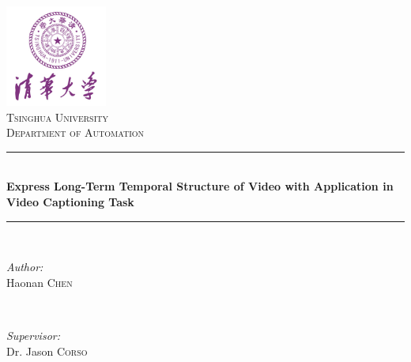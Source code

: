 



\begin{titlepage}

\newcommand{\HRule}{\rule{\linewidth}{0.5mm}} %

\center %

\includegraphics[width=0.25\textwidth]{resources/logo.jpg}\\[1cm] %


\textsc{\LARGE Tsinghua University}\\[1.5cm] %
\textsc{\Large Department of Automation}\\[2.5cm] %


\HRule \\[0.4cm]
{ \large \bfseries Express Long-Term Temporal Structure of Video with Application in Video Captioning Task}\\[0.4cm] %
\HRule \\[3.5cm]


\begin{minipage}{0.4\textwidth}
\begin{flushleft} \large
\emph{Author:}\\
Haonan \textsc{Chen} %
\end{flushleft}
\end{minipage}
~
\begin{minipage}{0.4\textwidth}
\begin{flushright} \large
\emph{Supervisor:} \\
Dr. Jason \textsc{Corso} %
\end{flushright}
\end{minipage}\\[5cm]


\end{titlepage}
